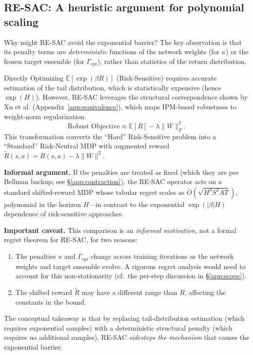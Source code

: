 \subsection{RE-SAC: A heuristic argument for polynomial scaling}
Why might RE-SAC avoid the exponential barrier? The key observation is that its penalty terms are \emph{deterministic} functions of the network weights (for $\kappa$) or the frozen target ensemble (for $\Gamma_{epi}$), rather than statistics of the return distribution.

Directly Optimizing $\mathbb{E}[\exp(\beta R)]$ (Risk-Sensitive) requires accurate estimation of the tail distribution, which is statistically expensive (hence $\exp(H)$).
However, RE-SAC leverages the structural correspondence shown by Xu et al. (Appendix~\ref{app:equivalence}), which maps IPM-based robustness to weight-norm regularization.
\begin{equation}
    \text{Robust Objective} \approx \mathbb{E}[R] - \lambda \|W\|_F^2.
\end{equation}
This transformation converts the ``Hard'' Risk-Sensitive problem into a ``Standard'' Risk-Neutral MDP with augmented reward $\tilde{R}(s,a) = R(s,a) - \lambda \|W\|^2$.

\textbf{Informal argument.}
If the penalties are treated as fixed (which they are per Bellman backup; see \S\ref{app:contraction}), the RE-SAC operator acts on a standard shifted-reward MDP whose tabular regret scales as $\tilde{O}(\sqrt{H^3 S^2 A T})$, polynomial in the horizon $H$---in contrast to the exponential $\exp(|\beta|H)$ dependence of risk-sensitive approaches.

\medskip
\textbf{Important caveat.}
This comparison is an \emph{informal motivation}, not a formal regret theorem for RE-SAC, for two reasons:
\begin{enumerate}
    \item The penalties $\kappa$ and $\Gamma_{epi}$ change across training iterations as the network weights and target ensemble evolve.  A rigorous regret analysis would need to account for this non-stationarity (cf.~the per-step discussion in \S\ref{app:scope}).
    \item The shifted reward $\tilde{R}$ may have a different range than $R$, affecting the constants in the bound.
\end{enumerate}
The conceptual takeaway is that by replacing tail-distribution estimation (which requires exponential samples) with a deterministic structural penalty (which requires no additional samples), RE-SAC \emph{sidesteps the mechanism} that causes the exponential barrier.

